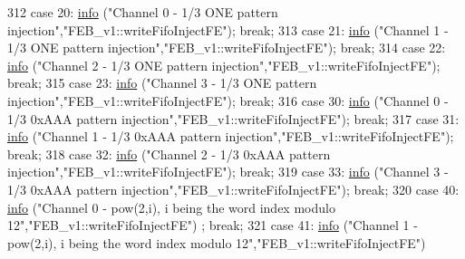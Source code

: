 \begin{DoxyCode}
312   \textcolor{keywordflow}{case} 20:  \hyperlink{classObject_a644fd329ea4cb85f54fa6846484b84a8}{info} (\textcolor{stringliteral}{"Channel 0 - 1/3 ONE pattern injection"},\textcolor{stringliteral}{"FEB\_v1::writeFifoInjectFE"}); \textcolor{keywordflow}{break};
313   \textcolor{keywordflow}{case} 21:  \hyperlink{classObject_a644fd329ea4cb85f54fa6846484b84a8}{info} (\textcolor{stringliteral}{"Channel 1 - 1/3 ONE pattern injection"},\textcolor{stringliteral}{"FEB\_v1::writeFifoInjectFE"}); \textcolor{keywordflow}{break};
314   \textcolor{keywordflow}{case} 22:  \hyperlink{classObject_a644fd329ea4cb85f54fa6846484b84a8}{info} (\textcolor{stringliteral}{"Channel 2 - 1/3 ONE pattern injection"},\textcolor{stringliteral}{"FEB\_v1::writeFifoInjectFE"}); \textcolor{keywordflow}{break};
315   \textcolor{keywordflow}{case} 23:  \hyperlink{classObject_a644fd329ea4cb85f54fa6846484b84a8}{info} (\textcolor{stringliteral}{"Channel 3 - 1/3 ONE pattern injection"},\textcolor{stringliteral}{"FEB\_v1::writeFifoInjectFE"}); \textcolor{keywordflow}{break};
316   \textcolor{keywordflow}{case} 30:  \hyperlink{classObject_a644fd329ea4cb85f54fa6846484b84a8}{info} (\textcolor{stringliteral}{"Channel 0 - 1/3 0xAAA pattern injection"},\textcolor{stringliteral}{"FEB\_v1::writeFifoInjectFE"}); \textcolor{keywordflow}{break};
317   \textcolor{keywordflow}{case} 31:  \hyperlink{classObject_a644fd329ea4cb85f54fa6846484b84a8}{info} (\textcolor{stringliteral}{"Channel 1 - 1/3 0xAAA pattern injection"},\textcolor{stringliteral}{"FEB\_v1::writeFifoInjectFE"}); \textcolor{keywordflow}{break};
318   \textcolor{keywordflow}{case} 32:  \hyperlink{classObject_a644fd329ea4cb85f54fa6846484b84a8}{info} (\textcolor{stringliteral}{"Channel 2 - 1/3 0xAAA pattern injection"},\textcolor{stringliteral}{"FEB\_v1::writeFifoInjectFE"}); \textcolor{keywordflow}{break};
319   \textcolor{keywordflow}{case} 33:  \hyperlink{classObject_a644fd329ea4cb85f54fa6846484b84a8}{info} (\textcolor{stringliteral}{"Channel 3 - 1/3 0xAAA pattern injection"},\textcolor{stringliteral}{"FEB\_v1::writeFifoInjectFE"}); \textcolor{keywordflow}{break};
320   \textcolor{keywordflow}{case} 40:  \hyperlink{classObject_a644fd329ea4cb85f54fa6846484b84a8}{info} (\textcolor{stringliteral}{"Channel 0 - pow(2,i), i being the word index modulo 12"},\textcolor{stringliteral}{"FEB\_v1::writeFifoInjectFE"})
      ; \textcolor{keywordflow}{break};
321   \textcolor{keywordflow}{case} 41:  \hyperlink{classObject_a644fd329ea4cb85f54fa6846484b84a8}{info} (\textcolor{stringliteral}{"Channel 1 - pow(2,i), i being the word index modulo 12"},\textcolor{stringliteral}{"FEB\_v1::writeFifoInjectFE"})

\end{DoxyCode}
